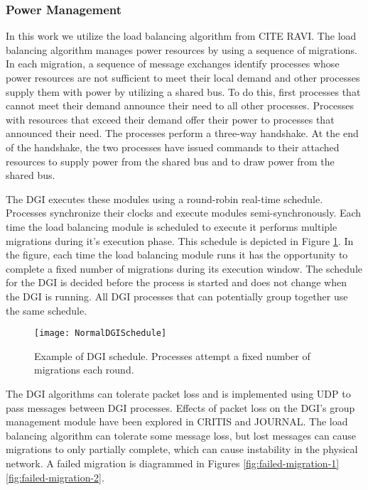 \subsubsection{Power Management}

In this work we utilize the load balancing algorithm from CITE RAVI.
The load balancing algorithm manages power resources by using a sequence of migrations.
In each migration, a sequence of message exchanges identify processes whose power resources are not sufficient to meet their local demand and other processes supply them with power by utilizing a shared bus.
To do this, first processes that cannot meet their demand announce their need to all other processes.
Processes with resources that exceed their demand offer their power to processes that announced their need.
The processes perform a three-way handshake.
At the end of the handshake, the two processes have issued commands to their attached resources to supply power from the shared bus and to draw power from the shared bus.

The DGI executes these modules using a round-robin real-time schedule.
Processes synchronize their clocks and execute modules semi-synchronously.
Each time the load balancing module is scheduled to execute it performs multiple migrations during it's execution phase.
This schedule is depicted in Figure \ref{fig:normal-schedule}.
In the figure, each time the load balancing module runs it has the opportunity to complete a fixed number of migrations during its execution window.
The schedule for the DGI is decided before the process is started and does not change when the DGI is running.
All DGI processes that can potentially group together use the same schedule.

\begin{figure}
\texttt{[image: NormalDGISchedule]}
\caption{Example of DGI schedule. Processes attempt a fixed number of migrations each round.} \label{fig:normal-schedule}
\end{figure}

The DGI algorithms can tolerate packet loss and is implemented using UDP to pass messages between DGI processes.
Effects of packet loss on the DGI's group management module have been explored in CRITIS and JOURNAL.
The load balancing algorithm can tolerate some message loss, but lost messages can cause migrations to only partially complete, which can cause instability in the physical network.
A failed migration is diagrammed in Figures \ref{fig:failed-migration-1} \ref{fig:failed-migration-2}.

